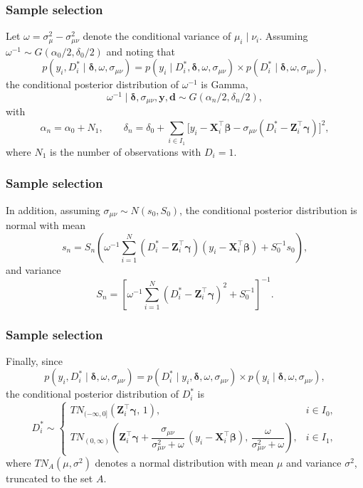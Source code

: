 \documentclass[12pt, compress]{beamer}
\begin{document}
\begin{frame}
	\frametitle{Sample selection}
Let $\omega=\sigma^2_{\mu}-\sigma^2_{\mu\nu}$ denote the conditional variance of $\mu_i \mid \nu_i$. 
Assuming $\omega^{-1}\sim G(\alpha_0/2,\delta_0/2)$ and noting that
\[
p(y_i,D_i^*\mid \boldsymbol{\delta},\omega,\sigma_{\mu\nu})
= p(y_i\mid D_i^*, \boldsymbol{\delta},\omega,\sigma_{\mu\nu})
\times p(D_i^*\mid \boldsymbol{\delta},\omega,\sigma_{\mu\nu}),
\]
the conditional posterior distribution of $\omega^{-1}$ is Gamma,
\[
\omega^{-1}\mid \boldsymbol{\delta},\sigma_{\mu\nu}, \mathbf{y},\mathbf{d} \sim G(\alpha_n/2,\delta_n/2),
\]
with
\[
\alpha_n=\alpha_0+N_1,
\qquad
\delta_n=\delta_0+\sum_{i\in I_1}\Big[y_i-\mathbf{X}_i^{\top}\boldsymbol{\beta}
-\sigma_{\mu\nu}(D_i^*-\mathbf{Z}_i^{\top}\boldsymbol{\gamma})\Big]^2,
\]
where $N_1$ is the number of observations with $D_i=1$.
\end{frame}

\begin{frame}
	\frametitle{Sample selection}
In addition, assuming $\sigma_{\mu\nu}\sim N(s_0,S_0)$, the conditional posterior distribution is normal with mean
\[
s_n=S_n\left(\omega^{-1}\sum_{i=1}^N(D_i^*-\mathbf{Z}_i^{\top}\boldsymbol{\gamma})(y_i-\mathbf{X}_i^{\top}\boldsymbol{\beta})
+S_0^{-1}s_0\right),
\]
and variance
\[
S_n=\left[\omega^{-1}\sum_{i=1}^N(D_i^*-\mathbf{Z}_i^{\top}\boldsymbol{\gamma})^2+S_0^{-1}\right]^{-1}.
\]
\end{frame}

\begin{frame}
	\frametitle{Sample selection}
Finally, since
\[
p(y_i,D_i^*\mid \boldsymbol{\delta},\omega,\sigma_{\mu\nu})
= p(D_i^*\mid y_i, \boldsymbol{\delta},\omega,\sigma_{\mu\nu})
\times p(y_i\mid \boldsymbol{\delta},\omega,\sigma_{\mu\nu}),
\]
the conditional posterior distribution of $D_i^*$ is
\[
D_i^* \sim 
\begin{cases}
	TN_{(-\infty,0]}(\mathbf{Z}_i^{\top}\boldsymbol{\gamma},\,1), & i\in I_0,\\[6pt]
	TN_{(0,\infty)}\!\left(\mathbf{Z}_i^{\top}\boldsymbol{\gamma}
	+\dfrac{\sigma_{\mu\nu}}{\sigma_{\mu\nu}^2+\omega}\,(y_i-\mathbf{X}_i^{\top}\boldsymbol{\beta}),\,
	\dfrac{\omega}{\sigma_{\mu\nu}^2+\omega}\right), & i\in I_1,
\end{cases}
\]
where $TN_{A}(\mu,\sigma^2)$ denotes a normal distribution with mean $\mu$ and variance $\sigma^2$, truncated to the set $A$.
\end{frame}
\end{document}
